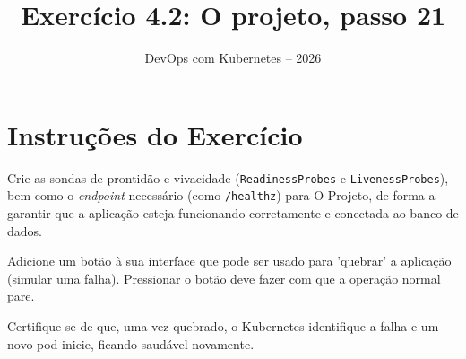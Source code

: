 \documentclass[11pt,a4paper]{article}
\title{\color{secondary}\Huge\textbf{Exercício 4.2: O projeto, passo 21}}
\author{\color{primary}DevOps com Kubernetes -- 2026}
\date{}
\begin{document}
\maketitle

\section*{\color{primary}Instruções do Exercício}
\begin{tcolorbox}[colback=blue!5!white,colframe=blue!75!black,title=Exercício 4.2: O projeto, passo 21]
Crie as sondas de prontidão e vivacidade (\texttt{ReadinessProbes} e \texttt{LivenessProbes}), bem como o \textit{endpoint} necessário (como \texttt{/healthz}) para O Projeto, de forma a garantir que a aplicação esteja funcionando corretamente e conectada ao banco de dados.

Adicione um botão à sua interface que pode ser usado para 'quebrar' a aplicação (simular uma falha). Pressionar o botão deve fazer com que a operação normal pare.

Certifique-se de que, uma vez quebrado, o Kubernetes identifique a falha e um novo pod inicie, ficando saudável novamente.
\end{tcolorbox}
\end{document}
